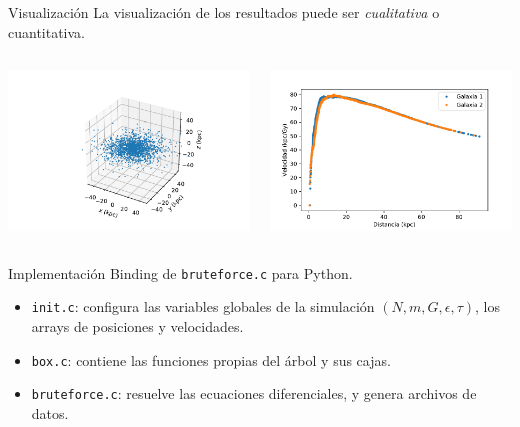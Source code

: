 \documentclass{beamer}
\begin{document}
\begin{frame}{Visualizaci\'on}
	La visualizaci\'on de los resultados puede ser \textit{cualitativa} o cuantitativa.
	\begin{columns}
		\begin{column}{0.5\textwidth}
			\includegraphics[height=0.35\textheight]{sources/images/galaxy_shape.pdf}
		\end{column}
		\begin{column}{0.5\textwidth}
			\includegraphics[height=0.35\textheight]{sources/images/rotation_curve.pdf}
		\end{column}
	\end{columns} 
\end{frame}
\begin{frame}{Implementaci\'on}
	Binding de \texttt{bruteforce.c} para Python.
	\begin{tcolorbox}[colback=green!5,colframe=green!40!black,title=C Programming Language]
		\begin{itemize}
			\item \texttt{init.c}: configura las variables globales de la simulaci\'on $(N, m, G, \epsilon, \tau)$, los arrays de posiciones y velocidades.
			\item \texttt{box.c}: contiene las funciones propias del \'arbol y sus cajas.
			\item \texttt{bruteforce.c}: resuelve las ecuaciones diferenciales, y genera archivos de datos.
		\end{itemize}
	\end{tcolorbox}
\end{frame}
\end{document}
